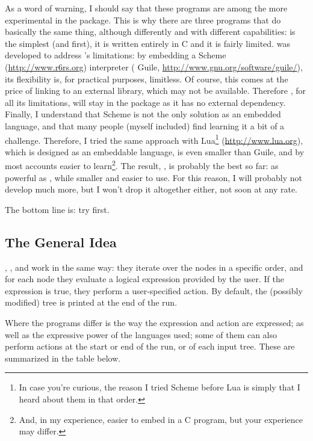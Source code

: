 As a word of warning, I should say that these programs are among the more
experimental in the \nutils{} package. This is why there are three programs that
do basically the same thing, although differently and with different
capabilities: \ed{} is the simplest (and first), it is written entirely in C and
it is fairly limited. \sched{} was developed to address \ed{}'s limitations: by
embedding a Scheme (\url{http://www.r6rs.org}) interpreter (\gnu{} Guile,
\url{http://www.gnu.org/software/guile/}), its flexibility is, for practical
purposes, limitless. Of course, this comes at the price of linking to an
external library, which may not be available. Therefore \ed{}, for all its
limitations, will stay in the package as it has no external dependency. Finally,
I understand that Scheme is not the only solution as an embedded language, and
that many people (myself included) find learning it a bit of a challenge.
Therefore, I tried the same approach with Lua\footnote{In case you're curious,
the reason I tried Scheme before Lua is simply that I heard about them in that
order.} (\url{http://www.lua.org}), which is designed as an embeddable language,
is even smaller than Guile, and by most accounts easier to learn\footnote{And,
in my experience, easier to embed in a C program, but your experience may
differ.}. The result, \luaed, is probably the best so far: as powerful as
\sched, while smaller and easier to use. For this reason, I will probably not
develop \sched{} much more, but I won't drop it altogether either, not soon at
any rate. 

\noindent{}The bottom line is: try \luaed{} first.

\subsection{The General Idea}

\ed, \sched, and \luaed{} work in the same way: they iterate over the nodes in a
specific order, and for each node they evaluate a logical expression provided by
the user. If the expression is true, they perform a user-specified action.  By
default, the (possibly modified) tree is printed at the end of the run.

Where the programs differ is the way the expression and action are expressed; as
well as the expressive power of the languages used; some of them can also
perform actions at the start or end of the run, or of each input tree. These are
summarized in the table below.

